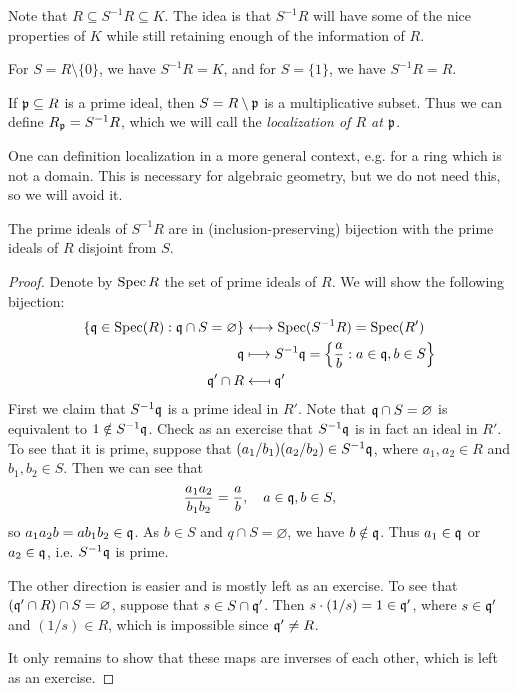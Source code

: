 \begin{remark}
  Note that $R \subseteq S^{-1} R \subseteq K$. The
  idea is that $S^{-1} R$ will have some of the nice
  properties of $K$ while still retaining enough
  of the information of $R$.
\end{remark}

\begin{example}
  For $S = R \setminus \{0\}$, we have
  $S^{-1} R = K$, and for $S = \{1\}$, we have
  $S^{-1} R = R$.
\end{example}

\begin{example}
  If $\mathfrak{p} \subseteq R$ is a prime ideal, then
  $S = R \setminus \mathfrak{p}$ is a multiplicative subset.
  Thus we can define $R_{\mathfrak{p}} = S^{-1} R$, which we
  will call the \emph{localization of $R$ at $\mathfrak{p}$}.
\end{example}

\begin{remark}
  One can definition localization in a more general
  context, e.g. for a ring which is not a domain.
  This is necessary for algebraic geometry, but we do
  not need this, so we will avoid it.
\end{remark}

\begin{prop}
  The prime ideals of $S^{-1} R$ are in
  (inclusion-preserving) bijection with
  the prime ideals of $R$ disjoint from $S$.
\end{prop}

\begin{proof}
  Denote by $\operatorname{Spec} R$ the set of prime ideals of $R$.
  We will show the following bijection:
  \begin{align*}
    \{\q \in \Spec(R) : \q \cap S = \varnothing\}
    &\longleftrightarrow \Spec(S^{-1} R) = \Spec(R') \\
    \q &\longmapsto S^{-1} \q = \left\{\frac{a}{b} : a \in \q, b \in S\right\} \\
    \q' \cap R &\mathrel{\reflectbox{\ensuremath{\longmapsto}}} \q'
  \end{align*}
  First we claim that $S^{-1} \mathfrak{q}$ is a prime ideal in
  $R'$. Note that $\mathfrak{q} \cap S = \varnothing$ is
  equivalent to $1 \notin S^{-1} \mathfrak{q}$. Check as an
  exercise that $S^{-1} \mathfrak{q}$ is in fact an ideal
  in $R'$. To see that it is prime, suppose that
  $(a_1 / b_1)(a_2 / b_2) \in S^{-1} \mathfrak{q}$, where
  $a_1, a_2 \in R$ and $b_1, b_2 \in S$. Then
  we can see that
  \[
    \frac{a_1 a_2}{b_1 b_2} = \frac{a}{b}, \quad a \in \mathfrak{q}, b \in S,
  \]
  so $a_1 a_2 b = a b_1 b_2 \in \mathfrak{q}$. As
  $b \in S$ and $q \cap S = \varnothing$, we have
  $b \notin \mathfrak{q}$. Thus $a_1 \in \mathfrak{q}$ or $a_2 \in \mathfrak{q}$, i.e.
  $S^{-1} \mathfrak{q}$ is prime.

  The other direction is easier and is mostly
  left as an exercise. To see that
  $(\mathfrak{q}' \cap R) \cap S = \varnothing$, suppose that
  $s \in S \cap \mathfrak{q}'$. Then $s \cdot (1 / s) = 1 \in \mathfrak{q}'$,
  where $s \in \mathfrak{q}'$ and $(1 / s) \in R$, which is
  impossible since $\mathfrak{q}' \ne R$.

  It only remains to show that these maps are
  inverses of each other, which is left as an exercise.
\end{proof}

